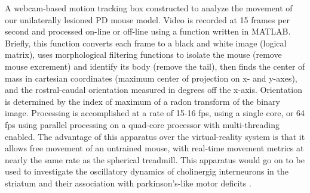 A webcam-based motion tracking box constructed to analyze the movement of our unilaterally lesioned PD mouse model.
Video is recorded at 15 frames per second and processed on-line or off-line using a function written in MATLAB.
Briefly, this function converts each frame to a black and white image (logical matrix), uses morphological filtering functions to isolate the mouse (remove mouse excrement) and identify its body (remove the tail), then finds the center of mass in cartesian coordinates (maximum center of projection on x- and y-axes), and the rostral-caudal orientation measured in degrees off the x-axis.
Orientation is determined by the index of maximum of a radon transform of the binary image.
Processing is accomplished at a rate of 15-16 fps, using a single core, or 64 fps using parallel processing on a quad-core processor with multi-threading enabled.
The advantage of this apparatus over the virtual-reality system is that it allows free movement of an untrained mouse, with real-time movement metrics at nearly the same rate as the spherical treadmill.
This apparatus would go on to be used to investigate the oscillatory dynamics of cholinergig interneurons in the striatum and their association with parkinson's-like motor deficits \cite{Kondabolu_2016}.

